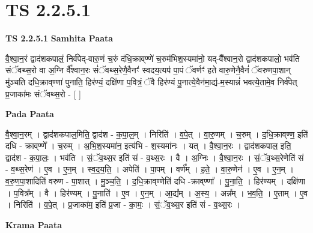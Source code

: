 \documentclass[17pt]{extarticle}
\begin{document}
\section{ TS 2.2.5.1 }

\textbf{TS 2.2.5.1 } \newline
\textbf{Samhita Paata} \newline

वै॒श्वा॒न॒रं द्वाद॑शकपालं॒ निर्व॑पेद्-वारु॒णं च॒रुं द॑धि॒क्राव्‌ण्णे॑ च॒रुम॑भिश॒स्यमा॑नो॒ यद्-वै᳚श्वान॒रो द्वाद॑शकपालो॒ भव॑ति संॅवथ्स॒रो वा अ॒ग्नि र्वै᳚श्वान॒रः सं॑ॅवथ्स॒रेणै॒वैनꣳ॑ स्वदय॒त्यप॑ पा॒पं ॅवर्णꣳ॑ हते वारु॒णेनै॒वैनं॑ ॅवरुणपा॒शान् मु॑ञ्चति दधि॒क्राव्‌ण्णा॑ पुनाति॒ हिर॑ण्यं॒ दक्षि॑णा प॒वित्रं॒ ॅवै हिर॑ण्यं पु॒नात्ये॒वैन॑मा॒द्य॑-म॒स्यान्नं॑ भवत्ये॒तामे॒व निर्व॑पेत् प्र॒जाका॑मः संॅवथ्स॒रो - [  ] \newline

\textbf{Pada Paata} \newline

वै॒श्वा॒न॒रम् । द्वाद॑शकपाल॒मिति॒ द्वाद॑श - क॒पा॒ल॒म् । निरिति॑ । व॒पे॒त् । वा॒रु॒णम् । च॒रुम् । द॒धि॒क्राव्‌ण्ण॒ इति॑ दधि - क्राव्‌ण्णे᳚ । च॒रुम् । अ॒भि॒श॒स्यमा॑न॒ इत्य॑भि - श॒स्यमा॑नः । यत् । वै॒श्वा॒न॒रः । द्वाद॑शकपाल॒ इति॒ द्वाद॑श - क॒पा॒लः॒ । भव॑ति । सं॒ॅव॒थ्स॒र इति॑ सं - व॒थ्स॒रः । वै । अ॒ग्निः । वै॒श्वा॒न॒रः । सं॒ॅव॒थ्स॒रेणेति॑ सं - व॒थ्स॒रेण॑ । ए॒व । ए॒न॒म् । स्व॒द॒य॒ति॒ । अपेति॑ । पा॒पम् । वर्ण᳚म् । ह॒ते॒ । वा॒रु॒णेन॑ । ए॒व । ए॒न॒म् । व॒रु॒ण॒पा॒शादिति॑ वरुण - पा॒शात् । मु॒ञ्च॒ति॒ । द॒धि॒क्राव्‌ण्णेति॑ दधि -क्राव्‌ण्णा᳚ । पु॒ना॒ति॒ । हिर॑ण्यम् । दक्षि॑णा । प॒वित्र᳚म् । वै । हिर॑ण्यम् । पु॒नाति॑ । ए॒व । ए॒न॒म् । आ॒द्य᳚म् । अ॒स्य॒ । अन्न᳚म् । भ॒व॒ति॒ । ए॒ताम् । ए॒व । निरिति॑ । व॒पे॒त् । प्र॒जाका॑म॒ इति॑ प्र॒जा - का॒मः॒ । सं॒ॅव॒थ्स॒र इति॑ सं - व॒थ्स॒रः ।  \newline


\textbf{Krama Paata} \newline
\end{document}
